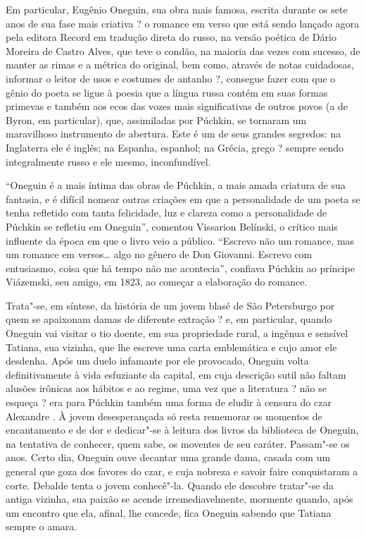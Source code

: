 Em particular, Eugênio Oneguin, sua obra mais famosa, escrita durante os
sete anos de sua fase mais criativa ? o romance em verso que está sendo
lançado agora pela editora Record em tradução direta do russo, na versão
poética de Dário Moreira de Castro Alves, que teve o condão, na maioria
das vezes com sucesso, de manter as rimas e a métrica do original, bem
como, através de notas cuidadosas, informar o leitor de usos e costumes
de antanho ?, consegue fazer com que o gênio do poeta se ligue à poesia
que a língua russa contém em suas formas primevas e também aos ecos das
vozes mais significativas de outros povos (a de Byron, em particular),
que, assimiladas por Púchkin, se tornaram um maravilhoso instrumento de
abertura. Este é um de seus grandes segredos: na Inglaterra ele é
inglês; na Espanha, espanhol; na Grécia, grego ? sempre sendo
integralmente russo e ele mesmo, inconfundível.

``Oneguin é a mais íntima das obras de Púchkin, a mais amada criatura de
sua fantasia, e é difícil nomear outras criações em que a personalidade
de um poeta se tenha refletido com tanta felicidade, luz e clareza como
a personalidade de Púchkin se refletiu em Oneguin'', comentou Vissarion
Belínski, o crítico mais influente da época em que o livro veio a
público. ``Escrevo não um romance, mas um romance em versos\ldots{} algo no
gênero de Don Giovanni. Escrevo com entusiasmo, coisa que há tempo não
me acontecia'', confiava Púchkin ao príncipe Viázemski, seu amigo, em
1823, ao começar a elaboração do romance.

Trata"-se, em síntese, da história de um jovem blasé de São Petersburgo
por quem se apaixonam damas de diferente extração ? e, em particular,
quando Oneguin vai visitar o tio doente, em sua propriedade rural, a
ingênua e sensível Tatiana, sua vizinha, que lhe escreve uma carta
emblemática e cujo amor ele desdenha. Após um duelo infamante por ele
provocado, Oneguin volta definitivamente à vida esfuziante da capital,
em cuja descrição sutil não faltam alusões irônicas aos hábitos e ao
regime, uma vez que a literatura ? não se esqueça ? era para Púchkin
também uma forma de eludir à censura do czar Alexandre . À jovem
desesperançada só resta rememorar os momentos de encantamento e de dor e
dedicar"-se à leitura dos livros da biblioteca de Oneguin, na tentativa
de conhecer, quem sabe, os moventes de seu caráter. Passam"-se os anos.
Certo dia, Oneguin ouve decantar uma grande dama, casada com um general
que goza dos favores do czar, e cuja nobreza e savoir faire conquistaram
a corte. Debalde tenta o jovem conhecê"-la. Quando ele descobre tratar"-se
da antiga vizinha, sua paixão se acende irremediavelmente, mormente
quando, após um encontro que ela, afinal, lhe concede, fica Oneguin
sabendo que Tatiana sempre o amara.

